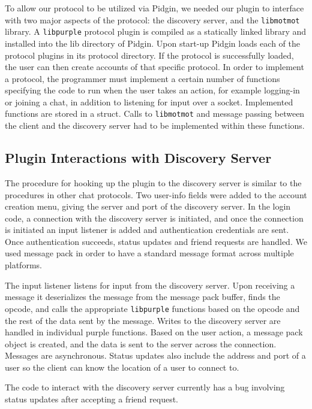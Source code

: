 \documentclass{sig-alternate}
\newcommand\libmotmot{\texttt{libmotmot}\xspace}
\newcommand\libpurple{\texttt{libpurple}\xspace}
\begin{document}
To allow our protocol to be utilized via Pidgin, we needed our plugin to
interface with two major aspects of the protocol: the discovery server, and the
\libmotmot library.  A \libpurple protocol plugin is compiled as a statically
linked library and installed into the lib directory of Pidgin. Upon start-up
Pidgin loads each of the protocol plugins in its protocol directory. If the
protocol is successfully loaded, the user can then create accounts of that
specific protocol.  In order to implement a protocol, the programmer must
implement a certain number of functions specifying the code to run when the user
takes an action, for example logging-in or joining a chat, in addition to
listening for input over a socket. Implemented functions are stored in a struct.
Calls to \libmotmot and message passing between the client and the discovery
server had to be implemented within these functions.

\subsection{Plugin Interactions with Discovery Server}
The procedure for hooking up the plugin to the discovery server is similar to
the procedures in other chat protocols. Two user-info fields were added to the
account creation menu, giving the server and port of the discovery server. In
the login code, a connection with the discovery server is initiated, and once
the connection is initiated an input listener is added and authentication
credentials are sent. Once authentication succeeds, status updates and friend
requests are handled. We used message pack in order to have a standard message
format across multiple platforms.

The input listener listens for input from the discovery server. Upon receiving a
message it deserializes the message from the message pack buffer, finds the
opcode, and calls the appropriate \libpurple functions based on the opcode and
the rest of the data sent by the message. Writes to the discovery server are
handled in individual purple functions. Based on the user action, a message pack
object is created, and the data is sent to the server across the connection.
Messages are asynchronous. Status updates also include the address and port
of a user so the client can know the location of a user to connect to.

The code to interact with the discovery server currently has a bug involving
status updates after accepting a friend request.
\end{document}
